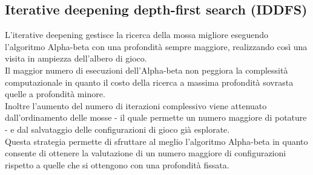 \subsection{Iterative deepening depth-first search (IDDFS)}
L'iterative deepening gestisce la ricerca della mossa migliore eseguendo l'algoritmo Alpha-beta con una profondità sempre maggiore, realizzando così una visita in ampiezza dell'albero di gioco.\\
Il maggior numero di esecuzioni dell'Alpha-beta non peggiora la complessità computazionale in quanto il costo della ricerca a massima profondità sovrasta quelle a profondità minore.\\
Inoltre l'aumento del numero di iterazioni complessivo viene attenuato dall'ordinamento delle mosse - il quale permette un numero maggiore di potature - e dal salvataggio delle configurazioni di gioco già esplorate.\\
Questa strategia permette di sfruttare al meglio l'algoritmo Alpha-beta in quanto consente di ottenere la valutazione di un numero maggiore di configurazioni rispetto a quelle che si ottengono con una profondità fissata.
